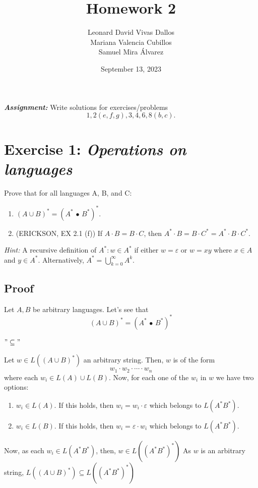\documentclass[12pt]{article}
\title{Homework 2}
\author{Leonard David Vivas Dallos \\ Mariana Valencia Cubillos \\ Samuel Mira Álvarez}
\date{September 13, 2023}
\begin{document}
\maketitle

\textbf{\textit{Assignment:}} Write solutions for exercises/problems
\begin{equation*}
    1, 2(e, f, g), 3, 4, 6, 8(b, c).
\end{equation*}

\tableofcontents

\section{Exercise 1: \textit{Operations on languages}}

Prove that for all languages A, B, and C:
\begin{enumerate}
    \item $(A \cup B)^* = (A^* \text{ • } B^* )^*$.
    \item (ERICKSON, EX 2.1 (f)) If $A \cdot B = B \cdot C$, then $A^* \cdot B = B \cdot C^* = A^* \cdot B \cdot C^*$.
\end{enumerate}

\textit{Hint:} A recursive definition of $A^*: w \in A^*$ if either $w = \varepsilon$ or $w = xy$ where $x \in A$ and $y \in A^*$. Alternatively, $A^* = \bigcup_{k=0}^{\infty} A^k$.

\subsection{Proof}
Let $A, B$ be arbitrary languages. Let's see that
\begin{equation*}
    (A \cup B)^* = (A^* \text{ • } B^* )^*
\end{equation*}

$"\subseteq"$

Let $w \in L((A \cup B)^*)$ an arbitrary string. Then, $w$ is of the form
\begin{equation*}
    w_1 \cdot w_2 \cdot \dotsb \cdot w_n
\end{equation*}
 where each $w_i \in L(A) \cup L(B)$. Now, for each one of the $w_i$ in $w$ we have two options:
 \begin{enumerate}
     \item $w_i \in L(A)$. If this holds, then $w_i = w_i \cdot \varepsilon$ which belongs to $L(A^*B^*)$.
     \item $w_i \in L(B)$. If this holds, then $w_i = \varepsilon \cdot w_i$ which belongs to $L(A^*B^*)$.
 \end{enumerate}
 Now, as each $w_i \in L(A^*B^*)$, then, $w \in L((A^*B^*)^*)$
 As $w$ is an arbitrary string, $L((A \cup B)^*) \subseteq L((A^*B^*)^*)$
\end{document}
